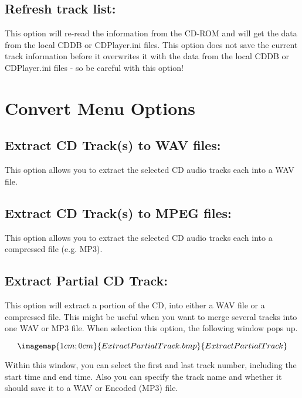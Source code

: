 \subsection{Refresh track list:}

This option will re-read the information from the CD-ROM and will get the data
from the local CDDB or CDPlayer.ini files. This option does not save the
current track information before it overwrites it with the data from the local CDDB
or CDPlayer.ini files - so be careful with this option!


\section{Convert Menu Options}
\subsection{Extract CD Track(s) to WAV files:}

This option allows you to extract the selected CD audio tracks each into
a WAV file.

\subsection{Extract CD Track(s) to MPEG files:}

This option allows you to extract the selected CD audio tracks each into
a compressed file (e.g. MP3).


\subsection{Extract Partial CD Track:}


This option will extract a portion of the CD, into either a WAV file or
a compressed file. This might be useful when you want to merge several
tracks into one WAV or MP3 file. When selection this option, the following
window pops up.

$$\imagemap{1cm;0cm}{ExtractPartialTrack.bmp}{ExtractPartialTrack}$$

Within this window, you can select the first and last track number, including 
the start time and end time. Also you can specify the track name and whether it should
save it to a WAV or Encoded (MP3) file.



